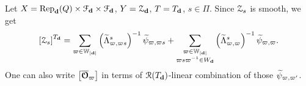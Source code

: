 \begin{eg}
Let $X=\operatorname{\operatorname{Rep}}_{\mathbf{d}}(Q) \times \mathcal{F}_{\mathbf{d}} \times \mathcal{F}_{\mathbf{d}}$, $Y=\operatorname{\mathcal{Z}}_{\mathbf{d}}$, $T=T_{\mathbf{d}}$, $s \in \Pi$. Since $\operatorname{\mathcal{Z}}_s$ is smooth, we get
$$\left[  \operatorname{\mathcal{Z}}_s \right]^{T_{\mathbf{d}}}= \sum_{\varpi \in \mathbb{W}_{|\mathbf{d}|}} \left( \widetilde{\Lambda}_{\varpi,\varpi s}^{s} \right)^{-1} \widetilde{\psi}_{\varpi,\varpi s} +  \sum_{\substack{\varpi \in \mathbb{W}_{|\mathbf{d}|} \\ \varpi s \varpi^{-1} \in W_{\mathbf{d}}}} \left( \widetilde{\Lambda}_{\varpi,\varpi}^{s} \right)^{-1} \widetilde{\psi}_{\varpi,\varpi}.$$
One can also write $\left[  \overline{\boldsymbol{\mathcal{O}}}_{\varpi} \right]$ in terms of $\operatorname{\operatorname{\mathcal{R}}}(T_{\mathbf{d}})$-linear combination of those $\widetilde{\psi}_{\varpi,\varpi'}$.
\end{eg}
